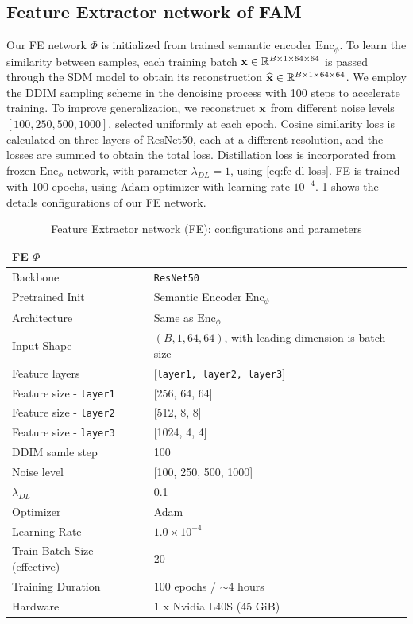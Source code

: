\subsection{Feature Extractor network of FAM}

Our FE network $\Phi$ is initialized from trained semantic encoder $\mathrm{Enc}_{\phi}$. To learn the similarity between samples, each training batch ${\mathbf{x}} \in \mathbb{R}^{B \times 1 \times 64 \times 64}$ is passed through the SDM model to obtain its reconstruction $\widehat{{\mathbf{x}}} \in \mathbb{R}^{B \times 1 \times 64 \times 64}$. We employ the DDIM sampling scheme in the denoising process with 100 steps to accelerate training. To improve generalization, we reconstruct ${\mathbf{x}}$ from different noise levels $[100, 250, 500, 1000]$, selected uniformly at each epoch. Cosine similarity loss is calculated on three layers of ResNet50, each at a different resolution, and the losses are summed to obtain the total loss. Distillation loss is incorporated from frozen $\mathrm{Enc}_{\phi}$ network, with parameter $\lambda_{DL} = 1$, using \cref{eq:fe-dl-loss}. FE is trained with 100 epochs, using Adam optimizer with learning rate $10^{-4}$. \cref{tab:fe-config} shows the details configurations of our FE network.  

\begin{table}[h]
\captionsetup{justification=raggedright,singlelinecheck=false}
\caption{Feature Extractor network (FE): configurations and parameters}
\begin{tabular}{ll}
\toprule
\multicolumn{2}{l}{\textbf{FE $\Phi$}} \\
\midrule
Backbone & \texttt{ResNet50}\cite{ResNet50} \\
Pretrained Init & Semantic Encoder $\mathrm{Enc}_{\phi}$ \\
Architecture & Same as $\mathrm{Enc}_{\phi}$ \\
Input Shape & $(B, 1, 64, 64)$, with leading dimension is batch size \\
Feature layers & [\texttt{layer1, layer2, layer3}] \\
Feature size - \texttt{layer1} & [256, 64, 64] \\
Feature size - \texttt{layer2} & [512, 8, 8] \\
Feature size - \texttt{layer3} & [1024, 4, 4] \\
DDIM samle step & 100 \\
Noise level & [100, 250, 500, 1000] \\
$\lambda_{DL}$ & 0.1 \\
Optimizer & Adam \\
Learning Rate & $1.0 \times 10^{-4}$ \\
Train Batch Size (effective) & 20 \\
Training Duration & 100 epochs / $\sim$4 hours \\
Hardware & 1 x Nvidia L40S (45 GiB) \\
\bottomrule
\end{tabular}
\label{tab:fe-config}
\end{table}

